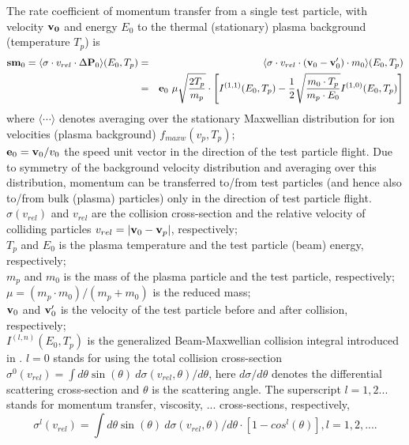 \documentclass[12pt,dvips]{article}
\begin{document}
The rate coefficient of momentum transfer from a single test particle, with velocity ${\bf v_0}$ and energy $E_0$ to the thermal (stationary) plasma background (temperature $T_p$) is
\begin{eqnarray}\label{mom-tally}
{\bf sm}_0=\langle\sigma\cdot v_{rel}\cdot \Delta {\bf P}_0\rangle(E_0,T_p)&=&
\langle\sigma\cdot v_{rel} \cdot \left({\bf v}_0-{\bf v}'_0\right)\cdot m_0\rangle(E_0,T_p)\\\nonumber
&=&
{\bf e}_0 \ \mu\sqrt{\frac{2T_p}{m_p}}\cdot\left[I^{(1,1)}(E_0,T_p)-
          \frac{1}{2}\sqrt{\frac{m_0\cdot T_p}{m_p\cdot E_0}}I^{(1,0)}(E_0,T_p)\right]
\end{eqnarray}
where
$\langle \cdots \rangle$ denotes averaging over the stationary Maxwellian distribution for ion velocities (plasma background) $f_{maxw}(v_p,T_p)$;\\
${\bf e}_0 = {\bf v}_0/v_0$ the speed unit vector in the direction of the test particle flight. Due to symmetry of the background velocity distribution
and averaging over this distribution, momentum can be transferred to/from test particles (and hence also to/from bulk (plasma) particles) only in
the direction of test particle flight.\\
$\sigma(v_{rel})$ and $v_{rel}$ are the collision cross-section and the relative velocity of colliding particles $v_{rel}=|{\bf v}_0 - {\bf v}_p|$, respectively;\\
$T_p$ and $E_0$ is the plasma temperature and the test particle (beam) energy, respectively;\\
$m_p$ and $m_0$ is the mass of the plasma particle and the test particle, respectively;\\
$\mu=(m_p\cdot m_0)/(m_p+m_0)$ is the reduced mass;\\
${\bf v}_0$ and ${\bf v}'_0$ is the velocity of the test particle before and after collision, respectively;\\
$I^{(l,n)}(E_0,T_p)$ is the generalized Beam-Maxwellian collision integral introduced in \cite{kn:Reiter-Janev}.
$l=0$ stands for using the total collision cross-section $\sigma^0(v_{rel}) = \int d\theta \sin(\theta) \ d\sigma(v_{rel},\theta)/d\theta$, here $d\sigma/d\theta$ denotes the differential scattering cross-section
and $\theta$ is the scattering angle.
The superscript $l=1,2...$ stands for momentum transfer, viscosity,
... cross-sections, respectively,
\begin{equation}
\sigma^l(v_{rel}) = \int d\theta \sin(\theta) \ d\sigma(v_{rel},\theta)/d\theta \cdot [1-cos^l(\theta)], l=1,2,....
\end{equation}
\end{document}
